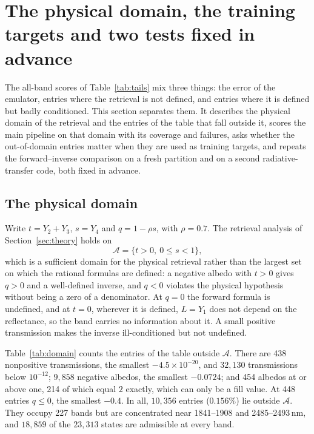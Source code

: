 \section{The physical domain, the training targets and two tests fixed in advance}\label{sec:domain}

The all-band scores of Table~\ref{tab:tails} mix three things: the error of the emulator, entries
where the retrieval is not defined, and entries where it is defined but badly conditioned. This
section separates them. It describes the physical domain of the retrieval and the entries of the
table that fall outside it, scores the main pipeline on that domain with its coverage and failures,
asks whether the out-of-domain entries matter when they are used as training targets, and repeats
the forward--inverse comparison on a fresh partition and on a second radiative-transfer code, both
fixed in advance.

\subsection{The physical domain}
Write $t=Y_2+Y_3$, $s=Y_4$ and $q=1-\rho s$, with $\rho=0.7$. The retrieval analysis of
Section~\ref{sec:theory} holds on
\[
  \mathcal A=\{t>0,\ 0\le s<1\},
\]
which is a sufficient domain for the physical retrieval rather than the largest set on which the
rational formulas are defined: a negative albedo with $t>0$ gives $q>0$ and a well-defined inverse,
and $q<0$ violates the physical hypothesis without being a zero of a denominator. At $q=0$ the
forward formula is undefined, and at $t=0$, wherever it is defined, $L=Y_1$ does not depend on the
reflectance, so the band carries no information about it. A small positive transmission makes the
inverse ill-conditioned but not undefined.

\begin{table}[t]
\centering

\caption{The table against the physical domain, over all $23{,}313\times285=6{,}644{,}205$
state--band entries. The categories overlap. Small positive transmission is a conditioning
property, not a violation of $t>0$; an albedo outside $[0,1)$ violates the physical domain
without necessarily leaving the algebraic domain of the inverse.}
\label{tab:domain}
\end{table}

Table~\ref{tab:domain} counts the entries of the table outside $\mathcal A$. There are 438
nonpositive transmissions, the smallest $-4.5\times10^{-20}$, and $32{,}130$ transmissions below
$10^{-12}$; $9{,}858$ negative albedos, the smallest $-0.0724$; and 454 albedos at or above one,
214 of which equal $2$ exactly, which can only be a fill value. At 448 entries $q\le0$, the
smallest $-0.4$. In all, $10{,}356$ entries ($0.156\%$) lie outside $\mathcal A$. They occupy 227
bands but are concentrated near 1841--1908 and 2485--2493\,nm, and $18{,}859$ of the $23{,}313$
states are admissible at every band.

